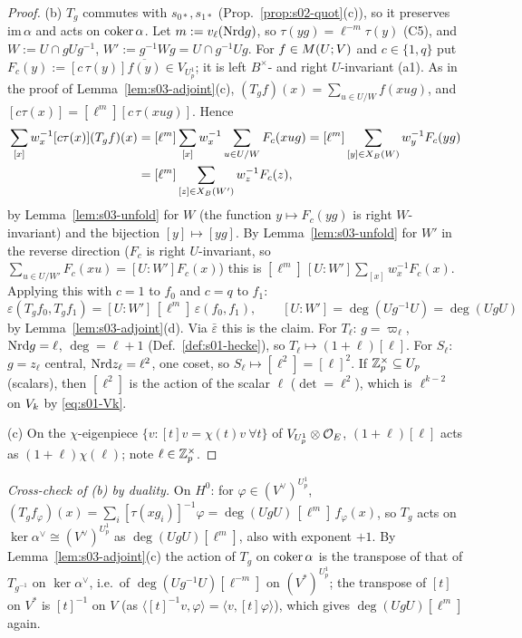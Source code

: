 \begin{proof}
(b) $T_g$ commutes with $s_{0*},s_{1*}$ (Prop.~\ref{prop:s02-quot}(c)), so it preserves $\mathrm{im}\,\alpha$ and acts on $\operatorname{coker}\alpha$. Let $m:=v_\ell(\mathrm{Nrd} g)$, so
$\tau(yg)=\ell^{-m}\tau(y)$ (C5), and $W:=U\cap gUg^{-1}$, $W':=g^{-1}Wg=U\cap g^{-1}Ug$. For $f\in M(U;V)$ and $c\in\{1,q\}$ put
$F_c(y):=[c\,\tau(y)]\overline{f(y)}\in V_{U^1_p}$; it is left $B^\times$- and right $U$-invariant (a1). As in the proof of Lemma~\ref{lem:s03-adjoint}(c),
$(T_gf)(x)=\sum_{u\in U/W}f(xug)$, and $[c\tau(x)]=[\ell^m][c\,\tau(xug)]$. Hence
\begin{align*}\sum_{[x]}w_x^{-1}[c\tau(x)](T_gf)(x)&=[\ell^m]\sum_{[x]}w_x^{-1}\sum_{u\in U/W}F_c(xug)=[\ell^m]\sum_{[y]\in X_B(W)}w_y^{-1}F_c(yg)\\
&=[\ell^m]\sum_{[z]\in X_B(W')}w_z^{-1}F_c(z),\end{align*}
by Lemma~\ref{lem:s03-unfold} for $W$ (the function $y\mapsto F_c(yg)$ is right $W$-invariant) and the bijection $[y]\mapsto[yg]$. By Lemma~\ref{lem:s03-unfold}
for $W'$ in the reverse direction ($F_c$ is right $U$-invariant, so $\sum_{u\in U/W'}F_c(xu)=[U:W']F_c(x)$) this is
$[\ell^m]\,[U:W']\sum_{[x]}w_x^{-1}F_c(x)$. Applying this with $c=1$ to $f_0$ and $c=q$ to $f_1$:
\[\varepsilon(T_gf_0,T_gf_1)=[U:W']\,[\ell^m]\,\varepsilon(f_0,f_1),\qquad [U:W']=\deg(Ug^{-1}U)=\deg(UgU)\]
by Lemma~\ref{lem:s03-adjoint}(d). Via $\bar\varepsilon$ this is the claim. For $T_\ell$: $g=\varpi_\ell$, $\mathrm{Nrd} g=\ell$, $\deg=\ell+1$ (Def.~\ref{def:s01-hecke}), so
$T_\ell\mapsto(1+\ell)[\ell]$. For $S_\ell$: $g=z_\ell$ central, $\mathrm{Nrd} z_\ell=\ell^2$, one coset, so $S_\ell\mapsto[\ell^2]=[\ell]^2$. If $\mathbb{Z}_p^\times\subseteq U_p$ (scalars),
then $[\ell^2]$ is the action of the scalar $\ell$ ($\det=\ell^2$), which is $\ell^{k-2}$ on $V_k$ by \eqref{eq:s01-Vk}.

(c) On the $\chi$-eigenpiece $\{v:[t]v=\chi(t)v\ \forall t\}$ of $V_{U^1_p}\otimes\mathcal{O}_E$, $(1+\ell)[\ell]$ acts as $(1+\ell)\chi(\ell)$; note $\ell\in\mathbb{Z}_p^\times$.
\end{proof}

\noindent\emph{Cross-check of (b) by duality.} On $H^0$: for $\varphi\in(V^\vee)^{U^1_p}$, $(T_gf_\varphi)(x)=\sum_i[\tau(xg_i)]^{-1}\varphi=\deg(UgU)\,[\ell^m]\,f_\varphi(x)$, so
$T_g$ acts on $\ker\alpha^\vee\cong(V^\vee)^{U^1_p}$ as $\deg(UgU)[\ell^m]$, also with exponent $+1$. By Lemma~\ref{lem:s03-adjoint}(c) the action of $T_g$ on
$\operatorname{coker}\alpha$ is the transpose of that of $T_{g^{-1}}$ on $\ker\alpha^\vee$, i.e.\ of $\deg(Ug^{-1}U)[\ell^{-m}]$ on $(V^*)^{U^1_p}$; the transpose of $[t]$ on $V^*$ is
$[t]^{-1}$ on $V$ (as $\langle[t]^{-1}v,\varphi\rangle=\langle v,[t]\varphi\rangle$), which gives $\deg(UgU)[\ell^m]$ again. \stproved

